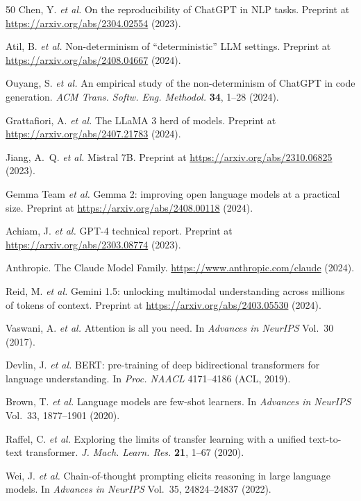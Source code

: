 \documentclass[sn-nature]{sn-jnl}
\begin{document}
\begin{thebibliography}{50}
Chen, Y. \emph{et al.}
On the reproducibility of ChatGPT in NLP tasks.
Preprint at \url{https://arxiv.org/abs/2304.02554} (2023).

Atil, B. \emph{et al.}
Non-determinism of ``deterministic'' LLM settings.
Preprint at \url{https://arxiv.org/abs/2408.04667} (2024).

Ouyang, S. \emph{et al.}
An empirical study of the non-determinism of ChatGPT in code generation.
\emph{ACM Trans. Softw. Eng. Methodol.} \textbf{34}, 1--28 (2024).

Grattafiori, A. \emph{et al.}
The LLaMA 3 herd of models.
Preprint at \url{https://arxiv.org/abs/2407.21783} (2024).

Jiang, A.~Q. \emph{et al.}
Mistral 7B.
Preprint at \url{https://arxiv.org/abs/2310.06825} (2023).

Gemma Team \emph{et al.}
Gemma 2: improving open language models at a practical size.
Preprint at \url{https://arxiv.org/abs/2408.00118} (2024).

Achiam, J. \emph{et al.}
GPT-4 technical report.
Preprint at \url{https://arxiv.org/abs/2303.08774} (2023).

Anthropic.
The Claude Model Family.
\url{https://www.anthropic.com/claude} (2024).

Reid, M. \emph{et al.}
Gemini 1.5: unlocking multimodal understanding across millions of tokens of context.
Preprint at \url{https://arxiv.org/abs/2403.05530} (2024).

Vaswani, A. \emph{et al.}
Attention is all you need.
In \emph{Advances in NeurIPS} Vol.~30 (2017).

Devlin, J. \emph{et al.}
BERT: pre-training of deep bidirectional transformers for language understanding.
In \emph{Proc. NAACL} 4171--4186 (ACL, 2019).

Brown, T. \emph{et al.}
Language models are few-shot learners.
In \emph{Advances in NeurIPS} Vol.~33, 1877--1901 (2020).

Raffel, C. \emph{et al.}
Exploring the limits of transfer learning with a unified text-to-text transformer.
\emph{J. Mach. Learn. Res.} \textbf{21}, 1--67 (2020).

Wei, J. \emph{et al.}
Chain-of-thought prompting elicits reasoning in large language models.
In \emph{Advances in NeurIPS} Vol.~35, 24824--24837 (2022).


\end{thebibliography}
\end{document}
